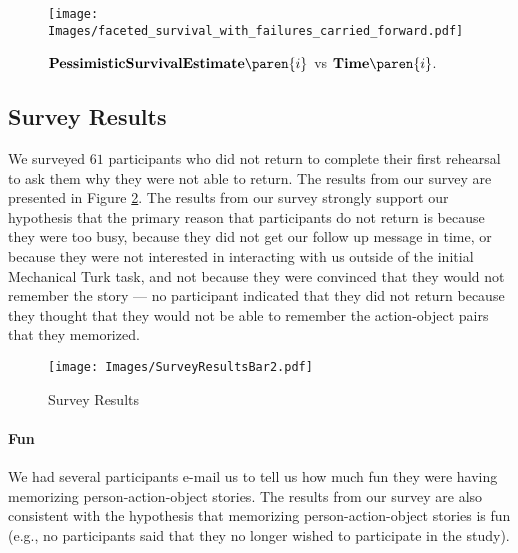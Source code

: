 \begin{figure}
\centering
\texttt{[image: Images/faceted\_survival\_with\_failures\_carried\_forward.pdf]}
\caption{$\mathbf{PessimisticSurvivalEstimate}\paren{i}$ vs $\mathbf{Time}\paren{i}$.}
\label{fig:FacetedTotalSurvival}
\end{figure}



\subsection{Survey Results} \label{subsubsec:SurveyResults} We surveyed $61$ participants who did not return to complete their first rehearsal to ask them why they were not able to return. The results from our survey are presented in Figure \ref{fig:SurveyReturned}. The results from our survey strongly support our hypothesis that the primary reason that participants do not return is because they were too busy, because they did not get our follow up message in time, or because they were not interested in interacting with us outside of the initial Mechanical Turk task, and not because they were convinced that they would not remember the story --- no participant indicated that they did not return because they thought that they would not be able to remember the action-object pairs that they memorized.

\begin{figure}[htb]
\begin{center}
\hspace*{-0.1\columnwidth}
\texttt{[image: Images/SurveyResultsBar2.pdf]}
\end{center}
\caption[Survey: Which of the following reasons best describes why you were unable to return to take the follow up test?]{Survey Results}
\label{fig:SurveyReturned}
\end{figure}

\paragraph*{Fun} We had several participants e-mail us to tell us how much fun they were having memorizing person-action-object stories. The results from our survey are also consistent with the hypothesis that memorizing person-action-object stories is fun (e.g., no participants said that they no longer wished to participate in the study). 

